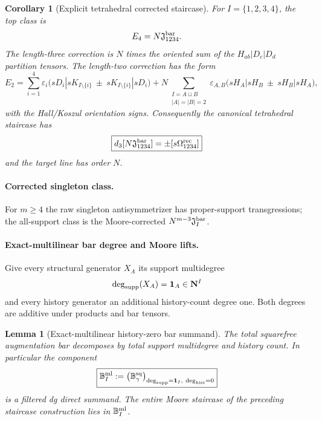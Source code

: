 \documentclass[11pt]{article}
\newtheorem{lemma}[theorem]{Lemma}
\newtheorem{corollary}[theorem]{Corollary}
\theoremstyle{remark}
\newcommand{\N}{\mathbf N}
\begin{document}
\begin{corollary}[Explicit tetrahedral corrected staircase]
\label{P2M-cor:v27-tetrahedral-staircase}
For \(I=\{1,2,3,4\}\), the top class is
\[
 E_4=N\mathfrak J_{1234}^{\rm bar}.
\]
The length-three correction is \(N\) times the oriented sum of the
\(H_{ab}|D_c|D_d\) partition tensors.  The length-two correction has the form
\begin{equation}
 \boxed{
 E_2
 =
 \sum_{i=1}^4
  \varepsilon_i
  \bigl(
    sD_i|sK_{I\setminus\{i\}}
    \ \pm\
    sK_{I\setminus\{i\}}|sD_i
  \bigr)
 +
 N\!\!\sum_{\substack{I=A\sqcup B\\|A|=|B|=2}}
  \varepsilon_{A,B}
  \bigl(
    sH_A|sH_B
    \ \pm\
    sH_B|sH_A
  \bigr),}
\end{equation}
with the Hall/Koszul orientation signs.  Consequently the canonical
tetrahedral staircase has
\[
 \boxed{
 d_3[N\mathfrak J_{1234}^{\rm bar}]
 =
 \pm[s\Omega_{1234}^{\rm rec}]}
\]
and the target line has order \(N\).
\end{corollary}

\paragraph{Corrected singleton class.}
For \(m\ge4\) the raw singleton antisymmetrizer has proper-support
transgressions; the all-support class is the Moore-corrected
\(N^{m-3}\mathfrak J_I^{\rm bar}\).


\paragraph{Exact-multilinear bar degree and Moore lifts.}


Give every structural generator \(X_A\) its support multidegree
\[
 \deg_{\rm supp}(X_A)=\mathbf1_A\in\N^I
\]
and every history generator an additional history-count degree one.  Both
degrees are additive under products and bar tensors.

\begin{lemma}[Exact-multilinear history-zero bar summand]
\label{P2M-lem:v28-exact-multilinear-summand}
The total squarefree augmentation bar decomposes by total support multidegree
and history count.  In particular the component
\begin{equation}
 \boxed{
 \mathbb B_I^{\rm ml}
 :=
 \left(
 \mathbb B_\gamma^{\rm sq}
 \right)_{\deg_{\rm supp}=\mathbf1_I,\ \deg_{\rm hist}=0}}
\end{equation}
is a filtered dg direct summand.  The entire Moore staircase of the preceding staircase construction lies in
\(\mathbb B_I^{\rm ml}\).
\end{lemma}
\end{document}
